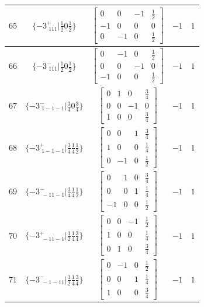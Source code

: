 \documentclass[fleqn,8pt]{jsarticle}
\begin{document}
\begin{longtable}{ccccc}
$ 65 $ & $ \{-3^{+}_{\,\,111}|\frac{1}{2} 0 \frac{1}{2}\} $ & $ \begin{bmatrix} 0 & 0 & -1 & \frac{1}{2} \\ -1 & 0 & 0 & 0 \\ 0 & -1 & 0 & \frac{1}{2} \end{bmatrix} $ & $ -1 $ & $ 1 $ \\ \hline
$ 66 $ & $ \{-3^{-}_{\,\,111}|\frac{1}{2} 0 \frac{1}{2}\} $ & $ \begin{bmatrix} 0 & -1 & 0 & \frac{1}{2} \\ 0 & 0 & -1 & 0 \\ -1 & 0 & 0 & \frac{1}{2} \end{bmatrix} $ & $ -1 $ & $ 1 $ \\ \hline
$ 67 $ & $ \{-3^{-}_{\,\,1-1-1}|\frac{3}{4} 0 \frac{3}{4}\} $ & $ \begin{bmatrix} 0 & 1 & 0 & \frac{3}{4} \\ 0 & 0 & -1 & 0 \\ 1 & 0 & 0 & \frac{3}{4} \end{bmatrix} $ & $ -1 $ & $ 1 $ \\ \hline
$ 68 $ & $ \{-3^{+}_{\,\,1-1-1}|\frac{3}{4} \frac{1}{4} \frac{1}{2}\} $ & $ \begin{bmatrix} 0 & 0 & 1 & \frac{3}{4} \\ 1 & 0 & 0 & \frac{1}{4} \\ 0 & -1 & 0 & \frac{1}{2} \end{bmatrix} $ & $ -1 $ & $ 1 $ \\ \hline
$ 69 $ & $ \{-3^{-}_{\,\,-11-1}|\frac{3}{4} \frac{1}{4} \frac{1}{2}\} $ & $ \begin{bmatrix} 0 & 1 & 0 & \frac{3}{4} \\ 0 & 0 & 1 & \frac{1}{4} \\ -1 & 0 & 0 & \frac{1}{2} \end{bmatrix} $ & $ -1 $ & $ 1 $ \\ \hline
$ 70 $ & $ \{-3^{+}_{\,\,-11-1}|\frac{1}{2} \frac{1}{4} \frac{3}{4}\} $ & $ \begin{bmatrix} 0 & 0 & -1 & \frac{1}{2} \\ 1 & 0 & 0 & \frac{1}{4} \\ 0 & 1 & 0 & \frac{3}{4} \end{bmatrix} $ & $ -1 $ & $ 1 $ \\ \hline
$ 71 $ & $ \{-3^{-}_{\,\,-1-11}|\frac{1}{2} \frac{1}{4} \frac{3}{4}\} $ & $ \begin{bmatrix} 0 & -1 & 0 & \frac{1}{2} \\ 0 & 0 & 1 & \frac{1}{4} \\ 1 & 0 & 0 & \frac{3}{4} \end{bmatrix} $ & $ -1 $ & $ 1 $ \\ \hline

\end{longtable}
\end{document}
